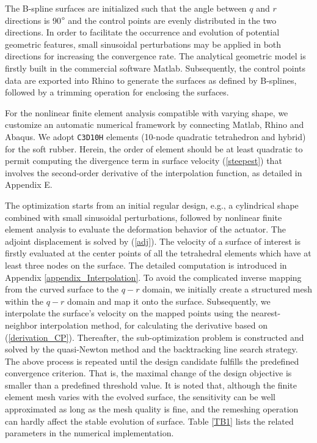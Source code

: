\documentclass[journal]{IEEEtran}
\theoremstyle{definition}
\begin{document}
The B-spline surfaces are initialized such that the angle between $q$ and $r$ directions is 90$\degree$ and the control points are evenly distributed in the two directions. In order to facilitate the occurrence and evolution of potential geometric features, small sinusoidal perturbations may be applied in both directions for increasing the convergence rate. The analytical geometric model is firstly built in the commercial software Matlab. Subsequently, the control points data are exported into Rhino to generate the surfaces as defined by B-splines, followed by a trimming operation for enclosing the surfaces.

For the nonlinear finite element analysis compatible with varying shape, we customize an automatic numerical framework by connecting Matlab, Rhino and Abaqus. We adopt \texttt{C3D10H} elements (10-node quadratic tetrahedron and hybrid) for the soft rubber. Herein, the order of element should be at least quadratic to permit computing the divergence term in surface velocity (\ref{steepest}) that involves the second-order derivative of the interpolation function, as detailed in Appendix E.

The optimization starts from an initial regular design, e.g., a cylindrical shape combined with small sinusoidal perturbations, followed by nonlinear finite element analysis to evaluate the deformation behavior of the actuator. The adjoint displacement is solved by (\ref{adj}). The velocity of a surface of interest is firstly evaluated at the center points of all the tetrahedral elements which have at least three nodes on the surface. The detailed computation is introduced in Appendix \ref{appendix_Interpolation}. To avoid the complicated inverse mapping from the curved surface to the $q-r$ domain, we initially create a structured mesh within the $q-r$ domain and map it onto the surface. Subsequently, we interpolate the surface's velocity on the mapped points using the nearest-neighbor interpolation method, for calculating the derivative based on (\ref{derivation_CP}). Thereafter, the sub-optimization problem is constructed and solved by the quasi-Newton method and the backtracking line search strategy. The above process is repeated until the design candidate fulfills the predefined convergence criterion. That is, the maximal change of the design objective is smaller than a predefined threshold value. It is noted that, although the finite element mesh varies with the evolved surface, the sensitivity can be well approximated as long as the mesh quality is fine, and the remeshing operation can hardly affect the stable evolution of surface. Table \ref{TB1} lists the related parameters in the numerical implementation.
\end{document}
